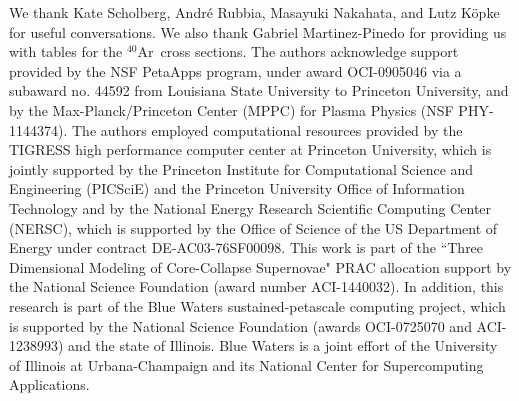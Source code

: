 \documentclass[iop,apj,appendixfloats]{emulateapj}
\def\ar40{$^{40}$Ar}
\begin{document}
\acknowledgments

We thank Kate Scholberg, Andr\'e Rubbia, Masayuki Nakahata, and 
Lutz K\"opke
for useful conversations.
We also thank Gabriel Martinez-Pinedo for providing us with tables
for the \ar40\ cross sections.
The authors acknowledge support provided by the NSF PetaApps 
program, under award OCI-0905046 via a subaward no. 44592 from 
Louisiana State University to Princeton University, and by the 
Max-Planck/Princeton Center (MPPC) for Plasma Physics 
(NSF PHY-1144374). The authors employed computational resources 
provided by the TIGRESS high performance computer center at 
Princeton University, which is jointly supported by the Princeton 
Institute for Computational Science and Engineering (PICSciE) and 
the Princeton University Office of Information Technology and by 
the National Energy Research Scientific Computing Center (NERSC), 
which is supported by the Office of Science of the US Department 
of Energy under contract DE-AC03-76SF00098. This work is part of 
the ``Three Dimensional Modeling of Core-Collapse Supernovae" PRAC 
allocation support by the National Science Foundation (award number 
ACI-1440032). In addition, this research is part of the Blue Waters 
sustained-petascale computing project, which is supported by the 
National Science Foundation (awards OCI-0725070 and ACI-1238993) 
and the state of Illinois. Blue Waters is a joint effort of the 
University of Illinois at Urbana-Champaign and its National Center 
for Supercomputing Applications.





\begin{appendix}
\setcounter{table}{0}
\renewcommand{\thetable}{A\arabic{table}}
\renewcommand{\theequation}{A\arabic{equation}}

\end{appendix}


\end{document}
